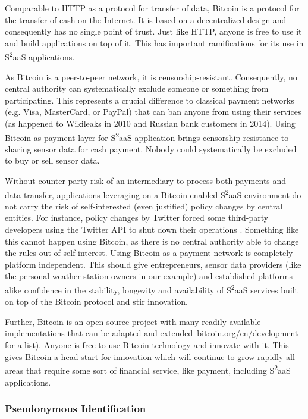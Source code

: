 Comparable to HTTP as a protocol for transfer of data, Bitcoin is a protocol for the transfer of cash on the Internet. It is based on a decentralized design and consequently has no single point of trust. Just like HTTP, anyone is free to use it and build applications on top of it. This has important ramifications for its use in S\textsuperscript{2}aaS applications.

As Bitcoin is a peer-to-peer network, it is censorship-resistant. Consequently, no central authority can systematically exclude someone or something from participating. This represents a crucial difference to classical payment networks (e.g. Visa, MasterCard, or PayPal) that can ban anyone from using their services (as happened to Wikileaks in 2010 and Russian bank customers in 2014). Using Bitcoin as payment layer for S\textsuperscript{2}aaS application brings censorship-resistance to sharing sensor data for cash payment. Nobody could systematically be excluded to buy or sell sensor data.

Without counter-party risk of an intermediary to process both payments and data transfer, applications leveraging on a Bitcoin enabled S\textsuperscript{2}aaS  environment do not carry the risk of self-interested (even justified) policy changes by central entities. For instance, policy changes by Twitter forced some third-party developers using the Twitter API to shut down their operations \parencite{twitterAPI}. Something like this cannot happen using Bitcoin, as there is no central authority able to change the rules out of self-interest. Using Bitcoin as a payment network is completely platform independent. This should give entrepreneurs, sensor data providers (like the personal weather station owners in our example) and established platforms alike confidence in the stability, longevity and availability of S\textsuperscript{2}aaS services built on top of the Bitcoin protocol and stir innovation.

Further, Bitcoin is an open source project with many readily available implementations that can be adapted and extended\ bitcoin.org/en/development for a list). Anyone is free to use Bitcoin technology and innovate with it. This gives Bitcoin a head start for innovation which will continue to grow rapidly all areas that require some sort of financial service, like payment, including S\textsuperscript{2}aaS applications.

\subsubsection{Pseudonymous Identification}

